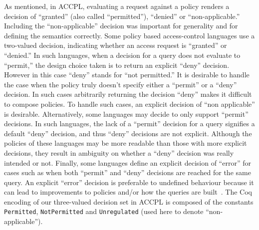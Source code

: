 \documentclass[runningheads,a4paper]{llncs}
\newcommand{\syn}{\texttt}
\begin{document}
As mentioned, in ACCPL, evaluating a request against a policy renders
a decision of ``granted'' (also called ``permitted''), ``denied'' or
``non-applicable.''  Including the ``non-applicable'' decision was
important for generality and for defining the semantics correctly.
Some policy based access-control languages use a two-valued decision,
indicating whether an access request is ``granted'' or ``denied.''  In
such languages, when a decision for a query does not evaluate to
``permit,'' the design choice taken is to return an explicit ``deny''
decision. However in this case ``deny'' stands for ``not permitted.''
It is desirable to handle the case when the policy truly doesn't
specify either a ``permit'' or a ``deny'' decision. In such cases
arbitrarily returning the decision ``deny'' makes it difficult to
compose policies.  To handle such cases, an explicit decision of ``non
applicable'' is desirable.  Alternatively, some languages may decide
to only support ``permit'' decisions. In such languages, the lack of a
``permit'' decision for a query signifies a default ``deny'' decision,
and thus ``deny'' decisions are not explicit. Although the policies of
these languages may be more readable than those with more explicit
decisions, they result in ambiguity on whether a ``deny'' decision was
really intended or not. Finally, some languages define an explicit
decision of ``error'' for cases such as when both ``permit'' and
``deny'' decisions are reached for the same query. An explicit
``error'' decision is preferable to undefined behaviour because it can
lead to improvements to policies and/or how the queries are
built~\cite{Tschantz}. The Coq encoding of our three-valued decision
set in \ac{ACCPL} is composed of the constants \syn{Permitted},
\syn{NotPermitted} and \syn{Unregulated} (used here to denote
``non-applicable'').
\end{document}
